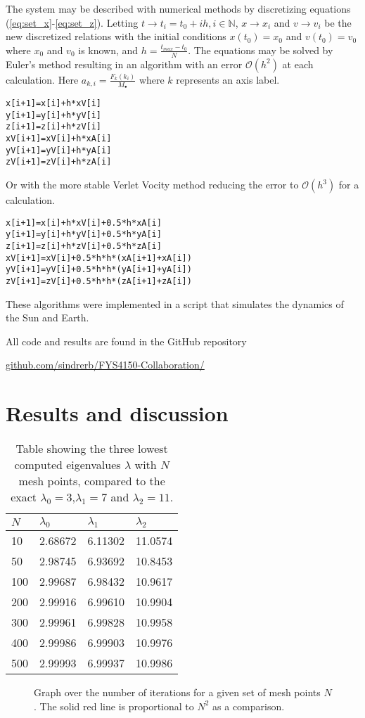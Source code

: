 \documentclass[twoside,twocolumn]{article}
\newcommand{\nl}{
	
	\medskip
	\noindent
}
\newcommand{\planet}{\bullet}
\newcommand{\err}[1]{\mathcal{O}(#1)}
\begin{document}
The system may be described with numerical methods by discretizing equations (\ref{eq:set_x}-\ref{eq:set_z}). Letting  $t\rightarrow t_i=t_0+ih, i\in \mathbb{N}$, $x\rightarrow x_i$ and $v\rightarrow v_i$ be the new discretized relations with the initial conditions $x(t_0)=x_0$ and $v(t_0)=v_0$ where $x_0$ and $v_0$ is known, and $h=\frac{t_{max}-t_0}{N} $. The equations may be solved by Euler's method resulting in an algorithm with an error $\err{h^2}$ at each calculation. Here $a_{k,i}=\frac{F_k(k_i)}{M_\planet}$ where $k$ represents an axis label.
\begin{lstlisting}[style=customc]
x[i+1]=x[i]+h*xV[i]
y[i+1]=y[i]+h*yV[i]
z[i+1]=z[i]+h*zV[i]
xV[i+1]=xV[i]+h*xA[i]
yV[i+1]=yV[i]+h*yA[i]
zV[i+1]=zV[i]+h*zA[i]
\end{lstlisting}

Or with the more stable Verlet Vocity method reducing the error to $\err{h^3}$ for a calculation. 
\begin{lstlisting}[style=customc]
x[i+1]=x[i]+h*xV[i]+0.5*h*xA[i]
y[i+1]=y[i]+h*yV[i]+0.5*h*yA[i]
z[i+1]=z[i]+h*zV[i]+0.5*h*zA[i]
xV[i+1]=xV[i]+0.5*h*h*(xA[i+1]+xA[i])
yV[i+1]=yV[i]+0.5*h*h*(yA[i+1]+yA[i])
zV[i+1]=zV[i]+0.5*h*h*(zA[i+1]+zA[i])
\end{lstlisting}
These algorithms were implemented in a script that simulates the dynamics of the Sun and Earth. 

All code and results are found in the GitHub repository\nl
{\small \href{https://github.com/sindrerb/FYS4150-Collaboration/tree/master/Doc/Project3}{github.com/sindrerb/FYS4150-Collaboration/}}
\section{Results and discussion}
\label{sec:results}

	
	\begin{table}[h]
\caption{Table showing the three lowest computed eigenvalues $\lambda$ with $N$ mesh points, compared to the exact $\lambda_0=3$,$\lambda_1=7$ and $\lambda_2=11$.}\label{tbl:convergence}
		\centering
		\begin{tabular}{|l|l|l|l|}\hline
			$N$ & $\lambda_0$ & $\lambda_1$ & $\lambda_2$\\ \hline
			10 & 2.68672 & 6.11302 & 11.0574\\
			50 & 2.98745 & 6.93692 & 10.8453\\
			100& 2.99687 & 6.98432 & 10.9617\\
			200& 2.99916 & 6.99610 & 10.9904\\
			300& 2.99961 & 6.99828 & 10.9958\\
			400& 2.99986 & 6.99903 & 10.9976\\
			500& 2.99993 & 6.99937 & 10.9986\\\hline
\end{tabular}
\end{table}
\begin{figure}[p]
		\caption{Graph over the number of iterations for a given set of mesh points $N$. The solid red line is proportional to $N^2$ as a comparison.}\label{fig:iterations}
\end{figure}
\end{document}
